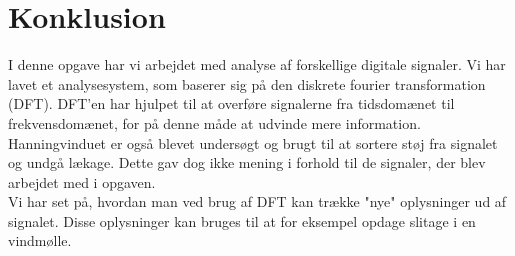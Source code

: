 \chapter{Konklusion}\label{ch:konclusion}
I denne opgave har vi arbejdet med analyse af forskellige digitale signaler. Vi har lavet et analysesystem, som baserer sig på den diskrete fourier transformation (DFT). DFT'en har hjulpet til at overføre signalerne fra tidsdomænet til frekvensdomænet, for på denne måde at udvinde mere information. \\ Hanningvinduet er også blevet undersøgt og brugt til at sortere støj fra signalet og undgå lækage. Dette gav dog ikke mening i forhold til de signaler, der blev arbejdet med i opgaven.\\
Vi har set på, hvordan man ved brug af DFT kan trække "nye" oplysninger ud af signalet. Disse oplysninger kan bruges til at for eksempel opdage slitage i en vindmølle.